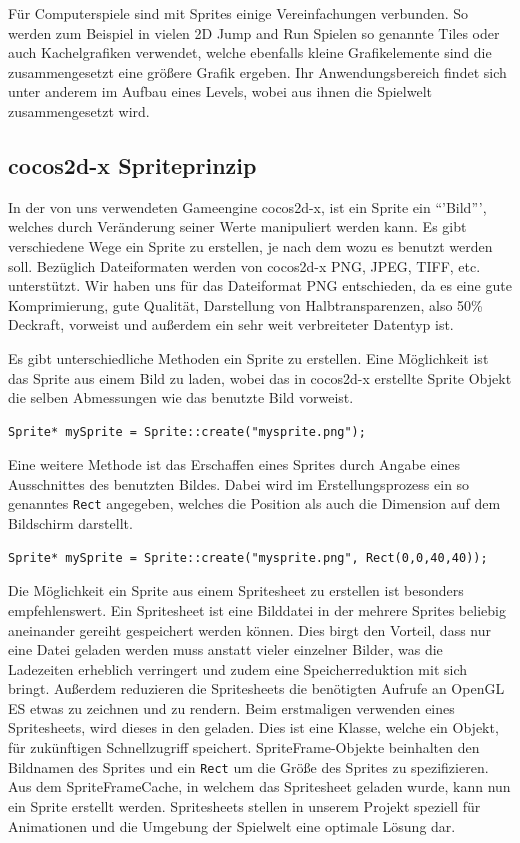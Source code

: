 Für Computerspiele sind mit Sprites einige Vereinfachungen verbunden. So werden zum Beispiel in vielen 2D Jump and Run Spielen so genannte Tiles oder auch Kachelgrafiken verwendet, welche ebenfalls kleine Grafikelemente sind die zusammengesetzt eine größere Grafik ergeben. Ihr Anwendungsbereich findet sich unter anderem im Aufbau eines Levels, wobei aus ihnen die Spielwelt zusammengesetzt wird.

\subsection{cocos2d-x Spriteprinzip}
In der von uns verwendeten Gameengine cocos2d-x, ist ein Sprite ein “'Bild”', welches durch Veränderung seiner Werte manipuliert werden kann. Es gibt verschiedene Wege ein Sprite zu erstellen, je nach dem wozu es benutzt werden soll. Bezüglich Dateiformaten werden von cocos2d-x PNG, JPEG, TIFF, etc. unterstützt. Wir haben uns für das Dateiformat PNG entschieden, da es eine gute Komprimierung, gute Qualität, Darstellung von Halbtransparenzen, also 50\% Deckraft, vorweist und außerdem ein sehr weit verbreiteter Datentyp ist.

Es gibt unterschiedliche Methoden ein Sprite zu erstellen. Eine Möglichkeit ist das Sprite aus einem Bild zu laden, wobei das in cocos2d-x erstellte Sprite Objekt die selben Abmessungen wie das benutzte Bild vorweist. 

\begin{lstlisting}[style=singleline]
Sprite* mySprite = Sprite::create("mysprite.png");
\end{lstlisting}

Eine weitere Methode ist das Erschaffen eines Sprites durch Angabe eines Ausschnittes des benutzten Bildes. Dabei wird im Erstellungsprozess ein so genanntes \texttt{Rect} angegeben, welches die Position als auch die Dimension auf dem Bildschirm darstellt. 

\begin{lstlisting}[style=singleline]
Sprite* mySprite = Sprite::create("mysprite.png", Rect(0,0,40,40));
\end{lstlisting}

Die Möglichkeit ein Sprite aus einem Spritesheet zu erstellen ist besonders empfehlenswert. Ein Spritesheet ist eine Bilddatei in der mehrere Sprites beliebig aneinander gereiht gespeichert werden können. Dies birgt den Vorteil, dass nur eine Datei geladen werden muss anstatt vieler einzelner Bilder, was die Ladezeiten erheblich verringert und zudem eine Speicherreduktion mit sich bringt. Außerdem reduzieren die Spritesheets die benötigten Aufrufe an OpenGL ES etwas zu zeichnen und zu rendern. Beim erstmaligen verwenden eines Spritesheets, wird dieses in den  geladen. Dies ist eine Klasse, welche ein  Objekt, für zukünftigen Schnellzugriff speichert. SpriteFrame-Objekte beinhalten den Bildnamen des Sprites und ein \texttt{Rect} um die Größe des Sprites zu spezifizieren. Aus dem SpriteFrameCache, in welchem das Spritesheet geladen wurde, kann nun ein Sprite erstellt werden.
Spritesheets stellen in unserem Projekt speziell für Animationen und die Umgebung der Spielwelt eine optimale Lösung dar. 



